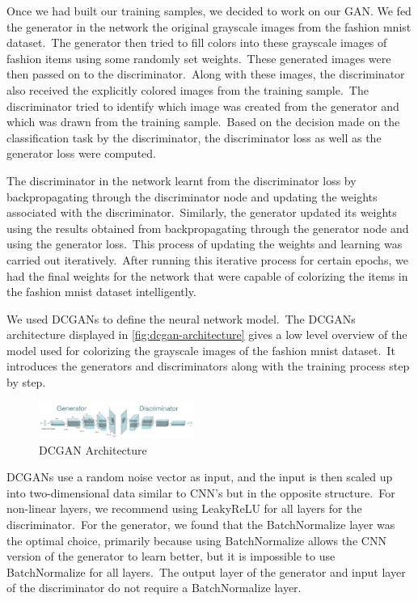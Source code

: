 \documentclass[conference]{IEEEtran}
\begin{document}
    Once we had built our training samples, we decided to work on our GAN. We fed the generator in the network the original grayscale images from the fashion mnist dataset.\ The generator then tried to fill colors into these grayscale images of fashion items using some randomly set weights.\ These generated images were then passed on to the discriminator.\ Along with these images, the discriminator also received the explicitly colored images from the training sample.\ The discriminator tried to identify which image was created from the generator and which was drawn from the training sample.\ Based on the decision made on the classification task by the discriminator, the discriminator loss as well as the generator loss were computed.

    The discriminator in the network learnt from the discriminator loss by backpropagating through the discriminator node and updating the weights associated with the discriminator.\ Similarly, the generator updated its weights using the results obtained from backpropagating through the generator node and using the generator loss.\ This process of updating the weights and learning was carried out iteratively.\ After running this iterative process for certain epochs, we had the final weights for the network that were capable of colorizing the items in the fashion mnist dataset intelligently.

    We used DCGANs to define the neural network model.\ The DCGANs architecture displayed in \autoref{fig:dcgan-architecture} gives a low level overview of the model used for colorizing the grayscale images of the fashion mnist dataset.\ It introduces the generators and discriminators along with the training process step by step.

    \begin{figure}
        \caption{DCGAN Architecture}
        \label{fig:dcgan-architecture}
        \includegraphics[width=0.45\textwidth]{architecture.png}
        \centering
    \end{figure}

    DCGANs use a random noise vector as input, and the input is then scaled up into two-dimensional data similar to CNN's but in the opposite structure.\ For non-linear layers, we recommend using LeakyReLU for all layers for the discriminator.\ For the generator, we found that the BatchNormalize layer was the optimal choice, primarily because using BatchNormalize allows the CNN version of the generator to learn better, but it is impossible to use BatchNormalize for all layers.\ The output layer of the generator and input layer of the discriminator do not require a BatchNormalize layer.\
\end{document}
